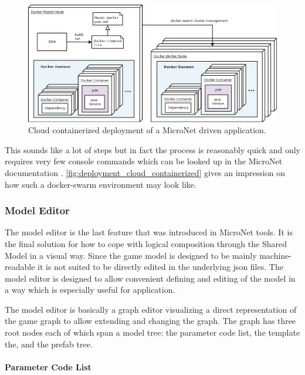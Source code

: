 \begin{figure}
	\hspace*{-0.8cm}
	\centering
	\includegraphics[width=1.1\textwidth]{images/architecture/DeploymentCloudContainerized}
	\caption{Cloud containerized deployment of a MicroNet driven application.}
	\label{fig:deployment_cloud_containerized}
\end{figure}

This sounds like a lot of steps but in fact the process is reasonably quick and
only requires very few console commands which can be looked up in the MicroNet
documentation \cite{micronet2017doku}.
\autoref{fig:deployment_cloud_containerized} gives an impression on how such a
docker-swarm environment may look like.

\subsubsection{Model Editor}

The model editor is the last feature that was introduced in MicroNet tools. It
is the final solution for how to cope with logical \ms{} composition through the
Shared Model in a visual way. Since the game model is designed to be mainly
machine-readable it is not suited to be directly edited in the underlying
\gls{json} files. The model editor is designed to allow convenient defining and
editing of the model in a way which is especially useful for \og{} application.

The model editor is basically a graph editor visualizing a direct representation
of the game graph to allow extending and changing the graph. The graph has
three root nodes each of which span a model tree: the parameter code list, the
template the, and the prefab tree.

\paragraph{Parameter Code List}

